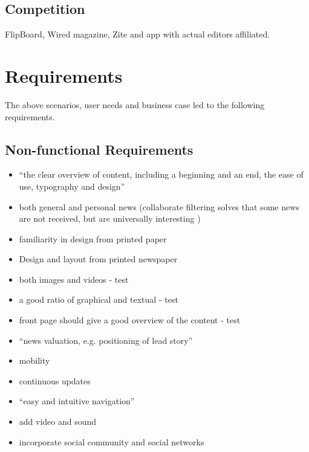 \subsection{Competition}
FlipBoard, Wired magazine, Zite and app with actual editors affiliated.

\section{Requirements}
The above scenarios, user needs and business case led to the following requirements.

\subsection{Non-functional Requirements}
\begin{itemize}
	\item ``the clear overview of content, including a beginning and an end, the ease of use, typography and design'' \cite[p. 7]{FULLTEXT01.pdf}
	\item both general and personal news (collaborate filtering solves that some news are not received, but are universally interesting \cite{fulltext.pdf})
	\item familiarity in design from printed paper \cite[p. 7]{FULLTEXT01.pdf}
	\item Design and layout from printed newspaper \cite{hcii2005_1004.pdf}
	\item both images and videos - test
	\item a good ratio of graphical and textual - test
	\item front page should give a good overview of the content - test
	\item ``news valuation, e.g. positioning of lead story'' \cite[p. 7]{FULLTEXT01.pdf}
	\item  mobility \cite[p. 7]{FULLTEXT01.pdf}
	\item  continuous updates \cite[p. 7]{FULLTEXT01.pdf}
	\item ``easy and intuitive navigation'' \cite[p. 7]{FULLTEXT01.pdf}
	\item add video and sound \cite[p. 7]{FULLTEXT01.pdf}


	\item incorporate social community and social networks
	
	
\end{itemize}

